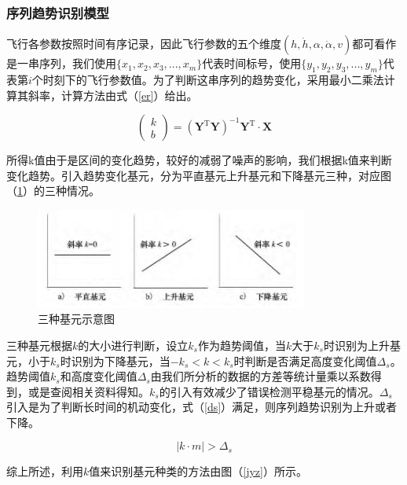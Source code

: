 \documentclass{my_paper}
\begin{document}
\subsubsection{序列趋势识别模型}

飞行各参数按照时间有序记录，因此飞行参数的五个维度$(h,\dot{h},\alpha,\dot{\alpha},v )$都可看作是一串序列，我们使用$\{x_1,x_2,x_3,...,x_m\}$代表时间标号，使用$\{y_1,y_2,y_3,...,y_m\}$代表第$i$个时刻下的飞行参数值。为了判断这串序列的趋势变化，采用最小二乘法计算其斜率，计算方法由式（\ref{er}）给出。

\begin{equation}
    \left(\begin{array}{l}k \\b\end{array}\right)=\left(\boldsymbol{Y}^{\mathrm{T}} \boldsymbol{Y}\right)^{-1} \boldsymbol{Y}^{\mathrm{T}} \cdot \boldsymbol{X}
\label{er}
\end{equation}

所得k值由于是区间的变化趋势，较好的减弱了噪声的影响，我们根据k值来判断变化趋势。引入趋势变化基元，分为平直基元上升基元和下降基元三种，对应图（\ref{jiyuan}）的三种情况。

\begin {figure}[h]
\centering %
\includegraphics[width=0.8\textwidth]{jiyuan.png}
\caption{三种基元示意图} %
\label{jiyuan}
\end {figure}

三种基元根据$k$的大小进行判断，设立$k_s$作为趋势阈值，当$k$大于$k_s$时识别为上升基元，小于$k_s$时识别为下降基元，当$-k_s<k<k_s$时判断是否满足高度变化阈值$\Delta_s$。趋势阈值$k_s$和高度变化阈值$\Delta_s$由我们所分析的数据的方差等统计量乘以系数得到，或是查阅相关资料得知。$k_s$的引入有效减少了错误检测平稳基元的情况。$\Delta_s$引入是为了判断长时间的机动变化，式（\ref{ds}）满足，则序列趋势识别为上升或者下降。

\begin{equation}
|k\cdot m|>\Delta_s
\label{ds}
\end{equation}

综上所述，利用$k$值来识别基元种类的方法由图（\ref{jyz}）所示。
\end{document}
